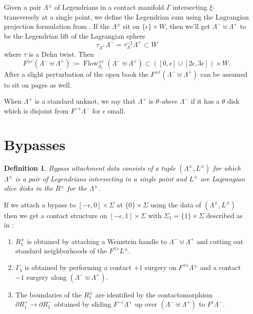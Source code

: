 \documentclass[11pt]{amsart}
\DeclareMathOperator{\Flow}{Flow}
\newcommand{\be}{\begin{enumerate}}
\newcommand{\ee}{\end{enumerate}}
\newcommand{\hypersurface}{\Sigma}
\newcommand{\posRegion}{R^{+}}
\newcommand{\negRegion}{R^{-}}
\newcommand{\posNegRegion}{R^{\pm}}
\newcommand{\Lag}{L}
\newcommand{\posNegLag}{\Lag^{\pm}}
\newcommand{\Leg}{\Lambda}
\newcommand{\posLeg}{\Leg^{+}}
\newcommand{\negLeg}{\Leg^{-}}
\newcommand{\posNegLeg}{\Leg^{\pm}}
\newcommand{\divSet}{\Gamma}
\newtheorem{defn}[thm]{Definition}
\begin{document}
Given a pair $\posNegLeg$ of Legendrians in a contact manifold $\divSet$ intersecting $\xi$-transversely at a single point, we define the Legendrian sum using the Lagrangian projection formulation from \cite{HH:Bypass}. If the $\posNegLeg$ sit on $\{ \epsilon \} \times W$, then we'll get $\negLeg \uplus \posLeg$ to be the Legendrian lift of the Lagrangian sphere
\begin{equation*}
 \tau_{\posLeg} \negLeg = \tau_{\negLeg}^{-1} \posLeg \subset W
\end{equation*}
where $\tau$ is a Dehn twist. Then
\begin{equation*}
F^{\pm\epsilon}(\negLeg \uplus \posLeg) := \Flow_{\partial_{t}}^{\pm \epsilon}(\negLeg \uplus \posLeg) \subset ([0, \epsilon] \cup [2\epsilon, 3\epsilon]) \times W.
\end{equation*}
After a slight perturbation of the open book the $F^{\pm \epsilon}(\negLeg \uplus \posLeg)$ can be assumed to sit on pages as well.

When $\posLeg$ is a standard unknot, we say that $\posLeg$ is \emph{$\theta$-above} $\negLeg$ if it has a $\theta$ disk which is disjoint from $F^{-\epsilon}\negLeg$ for $\epsilon$ small.

\section{Bypasses}

\begin{defn}
Bypass attachment data consists of a tuple $(\posNegLeg, \posNegLag)$ for which $\posNegLeg$ is a pair of Legendrians intersecting in a single point and $\posNegLag$ are Lagrangian slice disks in the $\posNegRegion$ for the $\posNegLeg$.
\end{defn}

If we attach a bypass to $[-\epsilon, 0] \times \hypersurface$ at $\{ 0 \} \times \hypersurface$ using the data of $(\posNegLeg, \posNegLag)$ then we get a contact structure on $[-\epsilon, 1] \times \hypersurface$ with $\hypersurface_{1} = \{1\} \times \hypersurface$ described as in \cite[Theorem 5.1.3]{HH:Bypass}:
\be
\item $\posNegRegion_{1}$ is obtained by attaching a Weinstein handle to $\negLeg \uplus \posLeg$ and cutting out standard neighborhoods of the $F^{\mp \epsilon}\posNegLag$.
\item $\divSet_{1}$ is obtained by performing a contact $+1$ surgery on $F^{\mp\epsilon}\posNegLeg$ and a contact $-1$ surgery along $(\negLeg \uplus \posLeg)$.
\item The boundaries of the $\posNegRegion_{1}$ are identified by the contactomorphism $\partial \posRegion_{1} \rightarrow \partial \negRegion_{1}$ obtained by sliding $F^{-\epsilon}\posLeg$ up over $(\negLeg \uplus \posLeg)$ to $F^{\epsilon}\negLeg$.
\ee
\end{document}
